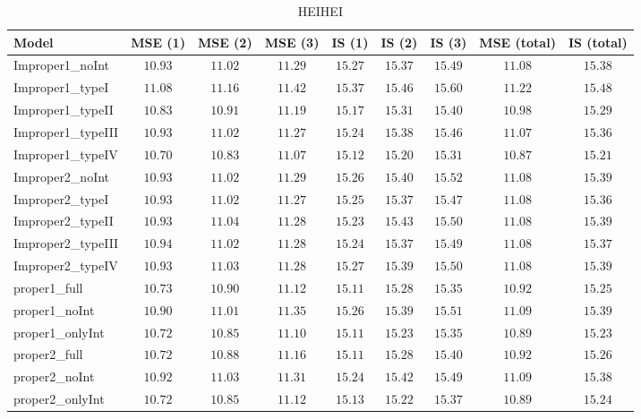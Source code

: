 \begin{table}

\caption{\label{tab:model-choice-sc2}HEIHEI}
\centering
\begin{tabular}{lcccccccc}
\hline
Model  & MSE (1) & MSE (2) & MSE (3) & IS (1) & IS (2) & IS (3) & MSE (total) & \multicolumn{1}{c}{IS (total)} \\ 
\hline
Improper1_noInt  & $10.93$ & $11.02$ & $11.29$ & $15.27$ & $15.37$ & $15.49$ & $11.08$ & $15.38$ \\
Improper1_typeI  & $11.08$ & $11.16$ & $11.42$ & $15.37$ & $15.46$ & $15.60$ & $11.22$ & $15.48$ \\
Improper1_typeII  & $10.83$ & $10.91$ & $11.19$ & $15.17$ & $15.31$ & $15.40$ & $10.98$ & $15.29$ \\
Improper1_typeIII  & $10.93$ & $11.02$ & $11.27$ & $15.24$ & $15.38$ & $15.46$ & $11.07$ & $15.36$ \\
Improper1_typeIV  & $10.70$ & $10.83$ & $11.07$ & $15.12$ & $15.20$ & $15.31$ & $10.87$ & $15.21$ \\
Improper2_noInt  & $10.93$ & $11.02$ & $11.29$ & $15.26$ & $15.40$ & $15.52$ & $11.08$ & $15.39$ \\
Improper2_typeI  & $10.93$ & $11.02$ & $11.27$ & $15.25$ & $15.37$ & $15.47$ & $11.08$ & $15.36$ \\
Improper2_typeII  & $10.93$ & $11.04$ & $11.28$ & $15.23$ & $15.43$ & $15.50$ & $11.08$ & $15.39$ \\
Improper2_typeIII  & $10.94$ & $11.02$ & $11.28$ & $15.24$ & $15.37$ & $15.49$ & $11.08$ & $15.37$ \\
Improper2_typeIV  & $10.93$ & $11.03$ & $11.28$ & $15.27$ & $15.39$ & $15.50$ & $11.08$ & $15.39$ \\
proper1_full  & $10.73$ & $10.90$ & $11.12$ & $15.11$ & $15.28$ & $15.35$ & $10.92$ & $15.25$ \\
proper1_noInt  & $10.90$ & $11.01$ & $11.35$ & $15.26$ & $15.39$ & $15.51$ & $11.09$ & $15.39$ \\
proper1_onlyInt  & $10.72$ & $10.85$ & $11.10$ & $15.11$ & $15.23$ & $15.35$ & $10.89$ & $15.23$ \\
proper2_full  & $10.72$ & $10.88$ & $11.16$ & $15.11$ & $15.28$ & $15.40$ & $10.92$ & $15.26$ \\
proper2_noInt  & $10.92$ & $11.03$ & $11.31$ & $15.24$ & $15.42$ & $15.49$ & $11.09$ & $15.38$ \\
proper2_onlyInt  & $10.72$ & $10.85$ & $11.12$ & $15.13$ & $15.22$ & $15.37$ & $10.89$ & $15.24$ \\
\hline 
\end{tabular}


\end{table}